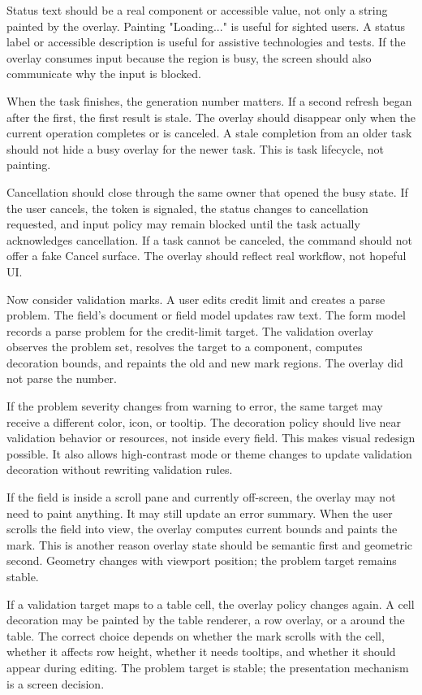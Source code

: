 Status text should be a real component or accessible value, not only a string painted by the overlay. Painting "Loading..." is useful for sighted users. A status label or accessible description is useful for assistive technologies and tests. If the overlay consumes input because the region is busy, the screen should also communicate why the input is blocked.

When the task finishes, the generation number matters. If a second refresh began after the first, the first result is stale. The overlay should disappear only when the current operation completes or is canceled. A stale completion from an older task should not hide a busy overlay for the newer task. This is task lifecycle, not painting.

Cancellation should close through the same owner that opened the busy state. If the user cancels, the token is signaled, the status changes to cancellation requested, and input policy may remain blocked until the task actually acknowledges cancellation. If a task cannot be canceled, the command should not offer a fake Cancel surface. The overlay should reflect real workflow, not hopeful UI.

Now consider validation marks. A user edits credit limit and creates a parse problem. The field's document or field model updates raw text. The form model records a parse problem for the credit-limit target. The validation overlay observes the problem set, resolves the target to a component, computes decoration bounds, and repaints the old and new mark regions. The overlay did not parse the number.

If the problem severity changes from warning to error, the same target may receive a different color, icon, or tooltip. The decoration policy should live near validation behavior or resources, not inside every field. This makes visual redesign possible. It also allows high-contrast mode or theme changes to update validation decoration without rewriting validation rules.

If the field is inside a scroll pane and currently off-screen, the overlay may not need to paint anything. It may still update an error summary. When the user scrolls the field into view, the overlay computes current bounds and paints the mark. This is another reason overlay state should be semantic first and geometric second. Geometry changes with viewport position; the problem target remains stable.

If a validation target maps to a table cell, the overlay policy changes again. A cell decoration may be painted by the table renderer, a row overlay, or a  around the table. The correct choice depends on whether the mark scrolls with the cell, whether it affects row height, whether it needs tooltips, and whether it should appear during editing. The problem target is stable; the presentation mechanism is a screen decision.


